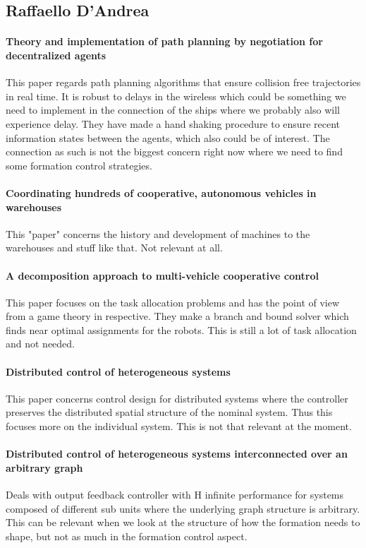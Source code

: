 \subsection{Raffaello D'Andrea}

\paragraph{Theory and implementation of path planning by negotiation for decentralized agents}
This paper regards path planning algorithms that ensure collision free trajectories in real time. It is robust to delays in the wireless which could be something we need to implement in the connection of the ships where we probably also will experience delay. They have made a hand shaking procedure to ensure recent information states between the agents, which also could be of interest.
The connection as such is not the biggest concern right now where we need to find some formation control strategies.

{\vskip0pt\color{gray}
\paragraph{Coordinating hundreds of cooperative, autonomous vehicles in warehouses}
This "paper" concerns the history and development of machines to the warehouses and stuff like that.
Not relevant at all.}

{\vskip0pt\color{gray}
\paragraph{A decomposition approach to multi-vehicle cooperative control}
This paper focuses on the task allocation problems and has the point of view from a game theory in respective. They make a branch and bound solver which finds near optimal assignments for the robots.
This is still a lot of task allocation and not needed.}

{\vskip0pt\color{gray}
\paragraph{Distributed control of heterogeneous systems}
This paper concerns control design for distributed systems where the controller preserves the distributed spatial structure of the nominal system. Thus this focuses more on the individual system.
This is not that relevant at the moment.}

{\vskip0pt\color{gray}
\paragraph{Distributed control of heterogeneous systems interconnected over an arbitrary graph}
Deals with output feedback controller with H infinite performance for systems composed of different sub units where the underlying graph structure is arbitrary.
This can be relevant when we look at the structure of how the formation needs to shape, but not as much in the formation control aspect.}

